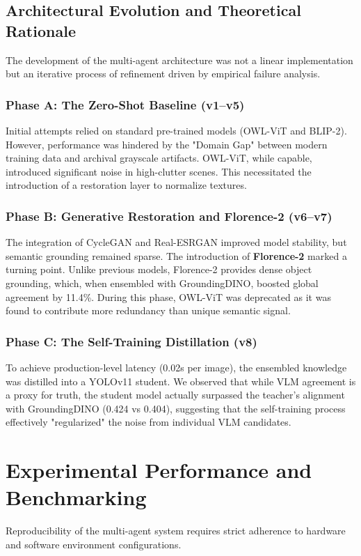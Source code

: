 \documentclass[12pt,onecolumn,a4paper]{IEEEtran}
\begin{document}
\subsection{Architectural Evolution and Theoretical Rationale}
The development of the multi-agent architecture was not a linear implementation but an iterative process of refinement driven by empirical failure analysis.

\subsubsection{Phase A: The Zero-Shot Baseline (v1--v5)}
Initial attempts relied on standard pre-trained models (OWL-ViT and BLIP-2). However, performance was hindered by the "Domain Gap" between modern training data and archival grayscale artifacts. OWL-ViT, while capable, introduced significant noise in high-clutter scenes. This necessitated the introduction of a restoration layer to normalize textures.

\subsubsection{Phase B: Generative Restoration and Florence-2 (v6--v7)}
The integration of CycleGAN and Real-ESRGAN improved model stability, but semantic grounding remained sparse. The introduction of \textbf{Florence-2} marked a turning point. Unlike previous models, Florence-2 provides dense object grounding, which, when ensembled with GroundingDINO, boosted global agreement by 11.4\%. During this phase, OWL-ViT was deprecated as it was found to contribute more redundancy than unique semantic signal.

\subsubsection{Phase C: The Self-Training Distillation (v8)}
To achieve production-level latency (0.02s per image), the ensembled knowledge was distilled into a YOLOv11 student. We observed that while VLM agreement is a proxy for truth, the student model actually surpassed the teacher's alignment with GroundingDINO (0.424 vs 0.404), suggesting that the self-training process effectively "regularized" the noise from individual VLM candidates.


\section{Experimental Performance and Benchmarking}
Reproducibility of the multi-agent system requires strict adherence to hardware and software environment configurations.
\end{document}
